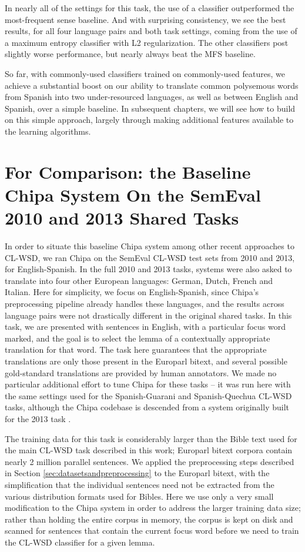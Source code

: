 In nearly all of the settings for this task, the use of a classifier
outperformed the most-frequent sense baseline. And with surprising consistency,
we see the best results, for all four language pairs and both task settings,
coming from the use of a maximum entropy classifier with L2 regularization. The
other classifiers post slightly worse performance, but nearly always beat the
MFS baseline.

So far, with commonly-used classifiers trained on commonly-used features, we
achieve a substantial boost on our ability to translate common polysemous words
from Spanish into two under-resourced languages, as well as between English and
Spanish, over a simple baseline. In subsequent chapters, we will see how to
build on this simple approach, largely through making additional features
available to the learning algorithms.

\section{For Comparison: the Baseline Chipa System On the SemEval 2010 and 2013
Shared Tasks}
\label{sec:baseline-semeval}

In order to situate this baseline Chipa system among other recent approaches to
CL-WSD, we ran Chipa on the SemEval CL-WSD test sets from 2010 and 2013, for
English-Spanish.
In the full 2010 and 2013 tasks, systems were also asked to translate into four
other European languages: German, Dutch, French and Italian. 
Here for simplicity, we focus on English-Spanish, since Chipa's preprocessing
pipeline already handles these languages, and the results across language pairs
were not drastically different in the original shared tasks.
In this task, we are presented with sentences in English, with a particular
focus word marked, and the goal is to select the lemma of a contextually
appropriate translation for that word\cite{lefever-hoste:2010:SemEval,task10}.
The task here guarantees that the appropriate translations are only those
present in the Europarl bitext, and several possible gold-standard translations
are provided by human annotators.  We made no particular additional effort to
tune Chipa for these tasks -- it was run here with the same settings used for
the Spanish-Guarani and Spanish-Quechua CL-WSD tasks, although the Chipa
codebase is descended from a system originally built for the 2013 task
\cite{rudnick-liu-gasser:2013:SemEval-2013}.

The training data for this task is considerably larger than the Bible text used
for the main CL-WSD task described in this work; Europarl bitext corpora
contain nearly 2 million parallel sentences. We applied the preprocessing steps
described in Section \ref{sec:datasetsandpreprocessing} to the Europarl bitext,
with the simplification that the individual sentences need not be extracted
from the various distribution formats used for Bibles.
Here we use only a very small modification to the Chipa system in order to
address the larger training data size; rather than holding the entire corpus in
memory, the corpus is kept on disk and scanned for sentences that contain the
current focus word before we need to train the CL-WSD classifier for a given
lemma.

